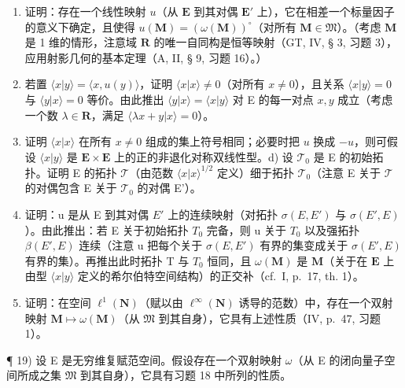 \begin{enumerate}
\def\labelenumi{\alph{enumi})}
\item
  证明：存在一个线性映射 \(u\)（从 \(\mathbf{E}\) 到其对偶 \(\mathbf{E}'\) 上），它在相差一个标量因子的意义下确定，且使得 \(u(\mathbf{M}) = (\omega(\mathbf{M}))^\circ\)（对所有 \(\mathbf{M} \in \mathfrak{M}\)）。（考虑 \(\mathbf{M}\) 是 1 维的情形，注意域 \(\mathbf{R}\) 的唯一自同构是恒等映射（GT, IV, § 3, 习题 3），应用射影几何的基本定理（A, II, § 9, 习题 16）。）
\item
  若置 \(\langle x|y\rangle = \langle x,u(y)\rangle\)，证明 \(\langle x|x\rangle \neq 0\)（对所有 \(x\neq 0\)），且关系 \(\langle x|y\rangle = 0\) 与 \(\langle y|x\rangle = 0\) 等价。由此推出 \(\langle y|x\rangle = \langle x|y\rangle\) 对 E 的每一对点 \(x,y\) 成立（考虑一个数 \(\lambda \in \mathbf{R}\)，满足 \(\langle \lambda x + y|x\rangle = 0\)）。
\item
  证明 \(\langle x|x\rangle\) 在所有 \(x\neq 0\) 组成的集上符号相同；必要时把 \(u\) 换成 \(-u\)，则可假设 \(\langle x|y\rangle\) 是 \(\mathbf{E}\times \mathbf{E}\) 上的正的非退化对称双线性型。d) 设 \(\mathcal{T}_0\) 是 E 的初始拓扑。证明 E 的拓扑 \(\mathcal{T}\)（由范数 \(\langle x|x\rangle^{1 / 2}\) 定义）细于拓扑 \(\mathcal{T}_0\)（注意 E 关于 \(\mathcal{T}\) 的对偶包含 E 关于 \(\mathcal{T}_0\) 的对偶 E'）。
\item
  证明：u 是从 E 到其对偶 \(E'\) 上的连续映射（对拓扑 \(\sigma(E, E')\) 与 \(\sigma(E', E)\)）。由此推出：若 E 关于初始拓扑 \(T_{0}\) 完备，则 u 关于 \(T_{0}\) 以及强拓扑 \(\beta(E', E)\) 连续（注意 u 把每个关于 \(\sigma(E, E')\) 有界的集变成关于 \(\sigma(E', E)\) 有界的集）。再推出此时拓扑 T 与 \(T_{0}\) 恒同，且 \(\omega(\mathbf{M})\) 是 \(\mathbf{M}\)（关于在 \(\mathbf{E}\) 上由型 \(\langle x|y\rangle\) 定义的希尔伯特空间结构）的正交补（cf.~I, p.~17, th. 1）。
\item
  证明：在空间 \(\ell^{1}(\mathbf{N})\)（赋以由 \(\ell^{\infty}(\mathbf{N})\) 诱导的范数）中，存在一个双射映射 \(\mathbf{M}\mapsto\omega(\mathbf{M})\)（从 \(\mathfrak{M}\) 到其自身），它具有上述性质（IV, p.~47, 习题 1）。
\end{enumerate}

¶ 19) 设 E 是无穷维复赋范空间。假设存在一个双射映射 \(\omega\)（从 E 的闭向量子空间所成之集 \(\mathfrak{M}\) 到其自身），它具有习题 18 中所列的性质。

